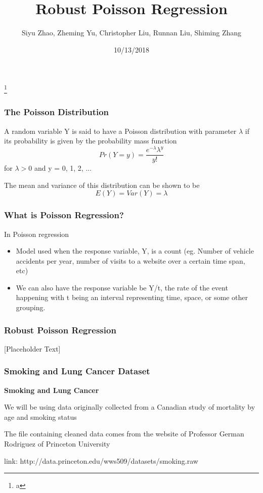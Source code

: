 \documentclass{beamer}
\title{Robust Poisson Regression}
\author{Siyu Zhao, Zheming Yu, Christopher Liu, Runnan Liu, Shiming Zhang}
\institute{San Diego State University, Stats 610}
\date{10/13/2018}
\begin{document}
	

\begin{frame}[plain]

	\titlepage
	
	\footnote{a}

\end{frame}



\begin{frame}[fragile]\frametitle{The Poisson Distribution}

	A random variable Y is said to have a Poisson distribution with parameter $\lambda$ if its probability is given by the probability mass function
	$$Pr(Y = y) = \frac{e^{-\lambda}\lambda^{y}}{y!}$$
	for $\lambda > 0$ and y = 0, 1, 2, ... 
 
	The mean and variance of this distribution can be shown to be
	$$E(Y) = Var(Y) = \lambda$$ 

\end{frame}



\begin{frame}[fragile]\frametitle{What is Poisson Regression?}
	In Poisson regression
	
	\begin{itemize}
	
		\item Model used when the response variable, Y, is a count (eg. Number of vehicle accidents per year, number of visits to a website over a certain time span, etc)
		\item We can also have the response variable be Y/t, the rate of the event happening with t being an interval representing time, space, or some other grouping.

	\end{itemize}

\end{frame}



\begin{frame}[fragile]\frametitle{Robust Poisson Regression}
	
	[Placeholder Text]	
	
\end{frame}



\begin{frame}[fragile]\frametitle{Smoking and Lung Cancer Dataset}

	\textbf{Smoking and Lung Cancer} 
	
	We will be using data originally collected from a Canadian study of mortality by age and smoking status
	
	The file containing cleaned data comes from the website of Professor German Rodriguez of Princeton University 
	
	link: http://data.princeton.edu/wws509/datasets/smoking.raw

\end{frame}
\end{document}
